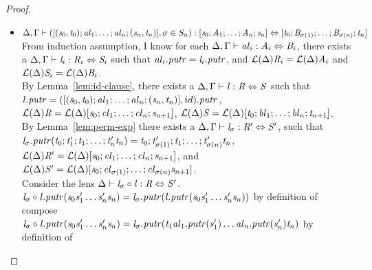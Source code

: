 \begin{lemma}
\begin{proof}
\begin{itemize}
\item$\Delta, \Gamma \vdash ([(\mathit{s}_0,\mathit{t}_0);\mathit{al}_1;\ldots;\mathit{al}_n;(\mathit{s}_n,\mathit{t}_n)],\sigma \in S_n) : [\mathit{s}_0 ; \mathit{A}_1 ; \ldots ; \mathit{A}_n ; \mathit{s}_n] \Leftrightarrow [\mathit{t}_0; \mathit{B}_{\sigma(1)} ; \ldots ; \mathit{B}_{\sigma(n)} ; \mathit{t}_n]$\\
From induction assumption, I know for each $\Delta, \Gamma \vdash \mathit{al}_i : \mathit{A}_i \Leftrightarrow \mathit{B}_i$, there exists a $\Delta, \Gamma \vdash \mathit{l}_i : \mathit{R}_i \Leftrightarrow \mathit{S}_i$ such that $\mathit{al}_i.\mathit{putr}=\mathit{l}_i.\mathit{putr}$,
and $\mathcal{L}(\Delta){\mathit{R}_i}=\mathcal{L}(\Delta){\mathit{A}_i}$ and $\mathcal{L}(\Delta){\mathit{S}_i}=\mathcal{L}(\Delta){\mathit{B}_i}$.\\
By Lemma~\ref{lem:id-clause}, there exists a $\Delta, \Gamma \vdash \mathit{l} : \mathit{R} \Leftrightarrow \mathit{S}$ such that $\mathit{l}.\mathit{putr}=([(\mathit{s}_0,\mathit{t}_0);\mathit{al}_1;\ldots;\mathit{al}_n;(\mathit{s}_n,\mathit{t}_n)],id).\mathit{putr}$,
$\mathcal{L}(\Delta){\mathit{R}}=\mathcal{L}(\Delta){[\mathit{s}_0;\mathit{cl}_1;\ldots;\mathit{cl}_n;\mathit{s}_{n+1}]}$,
$\mathcal{L}(\Delta){\mathit{S}}=\mathcal{L}(\Delta){[\mathit{t}_0;\mathit{bl}_1;\ldots;\mathit{bl}_n;\mathit{t}_{n+1}]}$.\\
By Lemma~\ref{lem:perm-exp} there exists a $\Delta, \Gamma \vdash \mathit{l}_{\sigma} : \mathit{R}' \Leftrightarrow \mathit{S}'$,
such that $\mathit{l}_{\sigma}.\mathit{putr}(\mathit{t}_0;\mathit{t}_1';\mathit{t}_1;\ldots;\mathit{t}_n'\mathit{t}_n)=\mathit{t}_0;\mathit{t}_{\sigma(1)}';\mathit{t}_1;\ldots;\mathit{t}_{\sigma(n)}'\mathit{t}_n$,
$\mathcal{L}(\Delta){\mathit{R}'}=\mathcal{L}(\Delta){[\mathit{s}_0;\mathit{cl}_1;\ldots;\mathit{cl}_n;\mathit{s}_{n+1}]}$, and
$\mathcal{L}(\Delta){\mathit{S}'}=\mathcal{L}(\Delta){[\mathit{s}_0;\mathit{cl}_{\sigma(1)};\ldots;\mathit{cl}_{\sigma(n)}\mathit{s}_{n+1}]}$.\\
Consider the lens $\Delta \vdash \mathit{l}_{\sigma} \circ \mathit{l} : \mathit{R} \Leftrightarrow \mathit{S}'$.\\
$\mathit{l}_{\sigma} \circ \mathit{l}.\mathit{putr}(\mathit{s}_0\mathit{s}_1'\ldots\mathit{s}_n'\mathit{s}_n)=\mathit{l}_{\sigma}.\mathit{putr}(\mathit{l}.\mathit{putr}(\mathit{s}_0\mathit{s}_1'\ldots\mathit{s}_n'\mathit{s}_n))$ by definition of compose\\
$\mathit{l}_{\sigma} \circ \mathit{l}.\mathit{putr}(\mathit{s}_0\mathit{s}_1'\ldots\mathit{s}_n'\mathit{s}_n)=\mathit{l}_{\sigma}.\mathit{putr}(\mathit{t}_1\mathit{al}_1.\mathit{putr}(\mathit{s}_1')\ldots\mathit{al}_n.\mathit{putr}(\mathit{s}_n')\mathit{t}_n)$ by definition of \Lens{}\\

\end{itemize}
\end{proof}
\end{lemma}
